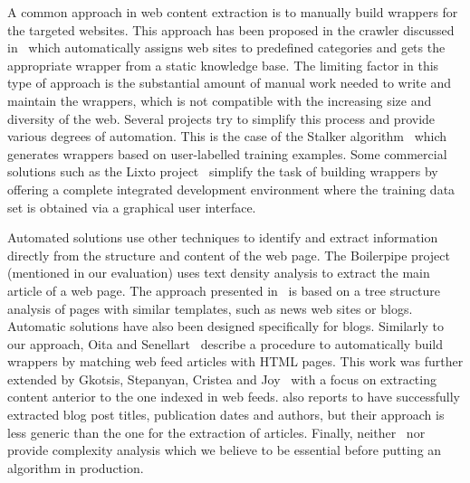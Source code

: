 A common approach in web content extraction is to manually build wrappers for the targeted websites. This approach has been proposed in the crawler discussed in~\cite{faheem2012intelligent} which automatically assigns web sites to predefined categories and gets the appropriate wrapper from a static knowledge base. The limiting factor in this type of approach is the substantial amount of manual work needed to write and maintain the wrappers, which is not compatible with the increasing size and diversity of the web. Several projects try to simplify this process and provide various degrees of automation. This is the case of the Stalker algorithm~\cite{stalker} which generates wrappers based on user-labelled training examples. Some commercial solutions such as the Lixto project~\cite{lixto} simplify the task of building wrappers by offering a complete integrated development environment where the training data set is obtained via a graphical user interface.

Automated solutions use other techniques to identify and extract information directly from the structure and content of the web page. The Boilerpipe project~\cite{kohlschuetter2010} (mentioned in our evaluation) uses text density analysis to extract the main article of a web page. The approach presented in~\cite{treeedit} is based on a tree structure analysis of pages with similar templates, such as news web sites or blogs. Automatic solutions have also been designed specifically for blogs. Similarly to our approach, Oita and Senellart~\cite{oita2010} describe a procedure to automatically build wrappers by matching web feed articles with HTML pages. This work was further extended by Gkotsis, Stepanyan, Cristea and Joy~\cite{gkotsis2013} with a focus on extracting content anterior to the one indexed in web feeds. \cite{gkotsis2013} also reports to have successfully extracted blog post titles, publication dates and authors, but their approach is less generic than the one for the extraction of articles. Finally, neither~\cite{oita2010} nor~\cite{gkotsis2013} provide complexity analysis which we believe to be essential before putting an algorithm in production.
